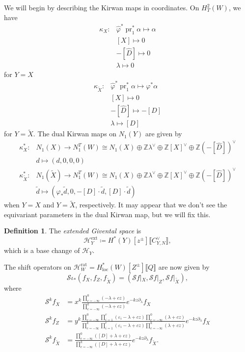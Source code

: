 \documentclass[leqno, openany]{memoir}
\theoremstyle{definition}
\newtheorem{defn}[thm]{Definition}
\theoremstyle{remark}
\theoremstyle{plain}
\theoremstyle{definition}
\theoremstyle{remark}
\newcommand{\Z}{\mathbb{Z}}
\newcommand{\ep}{\varepsilon}
\newcommand{\mc}[1]{\mathcal{#1}}
\newcommand{\mr}[1]{\mathrm{#1}}
\newcommand{\on}[1]{\operatorname{#1}}
\newcommand{\wt}[1]{\widetilde{#1}}
\newcommand{\wh}[1]{\widehat{#1}}
\begin{document}
We will begin by describing the Kirwan maps in coordinates. On $H^2_T(W)$, we have
\begin{align*}
    \kappa_X \colon & \wh{\varphi}^* \on{pr}_1^* \alpha \mapsto \alpha \\
    & [X] \mapsto 0 \\
    & -[\wh{D}] \mapsto 0 \\
    & \lambda \mapsto 0 
\end{align*}
for $Y = X$
\begin{align*}
    \kappa_{\wt{X}} \colon & \wh{\varphi}^* \on{pr}_1^* \alpha \mapsto \varphi^* \alpha \\
    & [X] \mapsto 0 \\
    & -[\wh{D}] \mapsto -[D] \\
    & \lambda \mapsto [D]
\end{align*}
for $Y = \wt{X}$. The dual Kirwan maps on $N_1(Y)$ are given by
\begin{align*}
    \kappa_X^* \colon & N_1(X) \to N_1^T(W) \cong N_1(X) \oplus \Z \lambda^{\vee} \oplus \Z[X]^{\vee} \oplus \Z(-[\wh{D}])^{\vee} \\
    & d \mapsto (d,0,0,0) \\
    \kappa_{\wt{X}}^* \colon & N_1(\wt{X}) \to N_1^T(W) \cong N_1(X) \oplus \Z \lambda^{\vee} \oplus \Z[X]^{\vee} \oplus \Z(-[\wh{D}])^{\vee} \\
    & \wt{d} \mapsto (\varphi_* \wt{d},0,-[D] \cdot \wt{d},[D] \cdot \wt{d})
\end{align*}
when $Y=X$ and $Y=\wt{X}$, respectively. It may appear that we don't see the equivariant parameters in the dual Kirwan map, but we will fix this.

\begin{defn}
    The \textit{extended Givental space} is
    \[ \mc{H}_Y^{\mr{ext}} \coloneqq H^*(Y)[z^{\pm}] \llbracket C_{Y,N}^{\vee} \rrbracket, \]
    which is a base change of $\mc{H}_Y$.
\end{defn}

The shift operators on $\mc{H}_W^{\mr{rat}} = H_{\mr{loc}}^*(W)[Z^{\pm}]\llbracket Q \rrbracket$ are now given by
\[ \mc{S} \iota_* (f_X, f_Z, f_{\wt{X}}) = (\mc{S} f|_X, \mc{S}f|_Z, \mc{S} f|_{\wt{X}}),\]
where
\begin{align*}
    \mc{S}^k f_X &= x^k \frac{\prod_{c=-\infty}^0 (-\lambda + cz)}{\prod_{c=-\infty}^k (-\lambda + cz)} e^{-kz \partial_{\lambda}} f_X \\
    \mc{S}^k f_Z &= y^k \frac{\prod_{c=-\infty}^0 \prod_{i=1}^r (\ep_i-\lambda + cz) \prod_{c=-\infty}^0 (\lambda + cz)}{\prod_{c=-\infty}^k \prod_{i=1}^r (\ep_i-\lambda + cz) \prod_{c=-\infty}^k (\lambda + cz)} e^{-kz \partial_{\lambda}} f_X \\
    \mc{S}^k f_{\wt{X}} &= \frac{\prod_{c=-\infty}^0 ([D] + \lambda + cz)}{\prod_{c=-\infty}^k ([D] + \lambda + cz)} e^{-kz \partial_{\lambda}} f_{\wt{X}}.
\end{align*}
\end{document}
